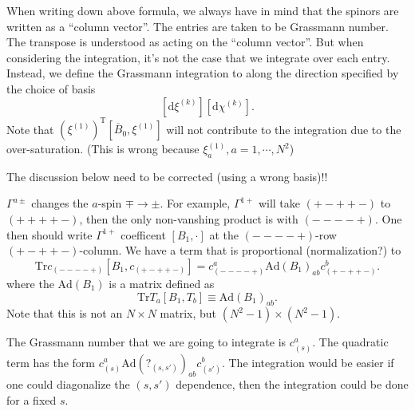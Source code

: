 When writing down above formula,
we always have in mind that the spinors are written as a ``column vector''.
The entries are taken to be Grassmann number.
The transpose is understood as acting on the ``column vector''.
But when considering the integration,
it's not the case that we integrate over each entry.
Instead, we define the Grassmann integration to along the direction
specified by the choice of basis
\[
	[\mathrm{d}\xi^{(k)}][\mathrm{d}\chi^{(k)}]
.\] 
Note that $(\xi^{(1)})^{\text{T}} [\overline{B}_0,\xi^{(1)}]$
will not contribute to the integration due to the over-saturation.
(This is wrong because $\xi^{(1)}_a,a=1,\cdots,N^2$)

\begin{wrong}
	The discussion below need to be corrected (using a wrong basis)!!
\end{wrong}

$\Gamma^{a\pm}$ changes the $a$-spin $\mp\to\pm$.
For example, $\Gamma^{1+}$ will take $(+-++-)$ to $(++++-)$,
then the only non-vanshing product is with $(----+)$.
One then should write $\Gamma^{1+}$ coefficent $[B_1,\cdot]$
at the $(----+)$-row $(+-++-)$-column.
We have a term that is proportional (normalization?) to
\[
	\mathrm{Tr} c_{(----+)} [B_1,c_{(+-++-)}] = 
	c_{(----+)}^a \mathrm{Ad}(B_1)_{ab} c_{(+-++-)}^b 
.\] 
where the $\mathrm{Ad}(B_1)$ is a matrix defined as
\[
	\mathrm{Tr} T_a [B_1,T_b] \equiv \mathrm{Ad}(B_1)_{ab}
.\] 
Note that this is not an $N\times N$ matrix,
but $(N^2-1)\times (N^2-1)$.

The Grassmann number that we are going to integrate is $c_{(s)}^a$.
The quadratic term has the form 
$ c_{(s)}^a \mathrm{Ad}(?_{(s,s')})_{ab} c_{(s')}^b $. 
The integration would be easier 
if one could diagonalize the $(s,s')$ dependence, 
then the integration could be done for a fixed $s$.


